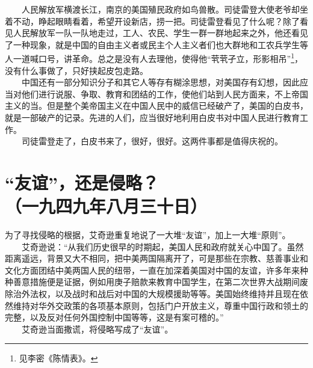 \documentclass[cn,11pt,chinese]{elegantbook}
\def\myformat#1{\hfil\hfil #1}
\begin{document}
　　人民解放军横渡长江，南京的美国殖民政府如鸟兽散。司徒雷登大使老爷却坐着不动，睁起眼睛看着，希望开设新店，捞一把。司徒雷登看见了什么呢？除了看见人民解放军一队一队地走过，工人、农民、学生一群一群地起来之外，他还看见了一种现象，就是中国的自由主义者或民主个人主义者们也大群地和工农兵学生等人一道喊口号，讲革命。总之是没有人去理他，使得他“茕茕孑立，形影相吊”\footnote[11]{ 见李密《陈情表》。}，没有什么事做了，只好挟起皮包走路。\\
　　中国还有一部分知识分子和其它人等存有糊涂思想，对美国存有幻想，因此应当对他们进行说服、争取、教育和团结的工作，使他们站到人民方面来，不上帝国主义的当。但是整个美帝国主义在中国人民中的威信已经破产了，美国的白皮书，就是一部破产的记录。先进的人们，应当很好地利用白皮书对中国人民进行教育工作。\\
　　司徒雷登走了，白皮书来了，很好，很好。这两件事都是值得庆祝的。\\
\newpage\section*{\myformat{“友谊”，还是侵略？}\\\myformat{（一九四九年八月三十日）}}
为了寻找侵略的根据，艾奇逊重复地说了一大堆“友谊”，加上一大堆“原则”。\\
　　艾奇逊说：“从我们历史很早的时期起，美国人民和政府就关心中国了。虽然距离遥远，背景又大不相同，把中美两国隔离开了，可是那些在宗教、慈善事业和文化方面团结中美两国人民的纽带，一直在加深着美国对中国的友谊，许多年来种种善意措施便是证据，例如用庚子赔款来教育中国学生，在第二次世界大战期间废除治外法权，以及战时和战后对中国的大规模援助等等。美国始终维持并且现在依然维持对华外交政策的各项基本原则，包括门户开放主义，尊重中国行政和领土的完整，以及反对任何外国控制中国等等，这是有案可稽的。”\\
　　艾奇逊当面撒谎，将侵略写成了“友谊”。\\
\end{document}
